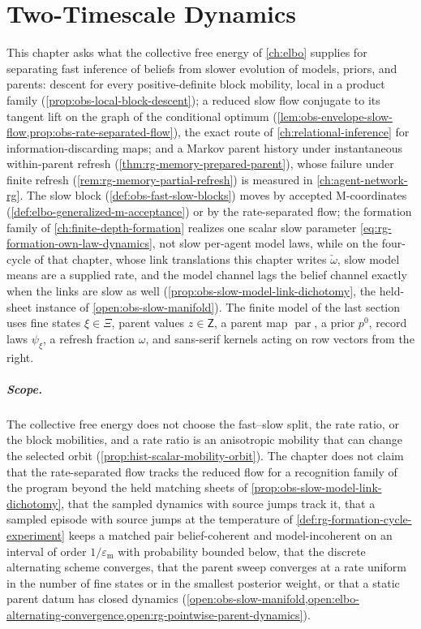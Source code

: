 \chapter{Two-Timescale Dynamics}
\label{ch:two-timescales}

This chapter asks what the collective free energy of \cref{ch:elbo} supplies for
separating fast inference of beliefs from slower evolution of models, priors, and
parents: descent for every positive-definite block mobility, local in a product family
(\cref{prop:obs-local-block-descent}); a reduced slow flow conjugate to its
tangent lift on the graph of the conditional optimum
(\cref{lem:obs-envelope-slow-flow,prop:obs-rate-separated-flow}), the exact route of
\cref{ch:relational-inference} for information-discarding maps; and a Markov parent
history under instantaneous within-parent refresh
(\cref{thm:rg-memory-prepared-parent}), whose failure under finite refresh
(\cref{rem:rg-memory-partial-refresh}) is measured in \cref{ch:agent-network-rg}. The
slow block (\cref{def:obs-fast-slow-blocks}) moves by accepted M-coordinates
(\cref{def:elbo-generalized-m-acceptance}) or by the rate-separated flow; the formation
family of \cref{ch:finite-depth-formation} realizes one scalar slow parameter
\eqref{eq:rg-formation-own-law-dynamics}, not slow per-agent model laws, while on
the four-cycle of that chapter, whose link translations this chapter writes
$\check\omega$, slow model means are a supplied rate, and the model
channel lags the belief channel exactly when the links are slow as well
(\cref{prop:obs-slow-model-link-dichotomy}, the held-sheet instance of
\cref{open:obs-slow-manifold}). The finite
model of the last section uses fine states $\xi\in\Xi$, parent values $z\in\mathsf Z$,
a parent map $\operatorname{par}$, a prior $p^0$, record laws $\psi_\xi$, a refresh
fraction $\omega$, and sans-serif kernels acting on row vectors from the right.

\paragraph{Scope.}
The collective free energy does not choose the fast--slow split, the rate ratio, or
the block mobilities, and a rate ratio is an anisotropic mobility that can change the
selected orbit (\cref{prop:hist-scalar-mobility-orbit}). The chapter does not claim
that the rate-separated flow tracks the reduced flow for a recognition family of the
program beyond the held matching sheets of
\cref{prop:obs-slow-model-link-dichotomy}, that the sampled dynamics with source
jumps track it, that a sampled episode with source jumps at the temperature of
\cref{def:rg-formation-cycle-experiment} keeps a matched pair belief-coherent and
model-incoherent on an interval of order $1/\varepsilon_{\mathrm m}$ with probability
bounded below, that the discrete alternating scheme converges, that the parent sweep
converges at a rate uniform in the number of fine states or in the smallest posterior
weight, or that a static parent datum has closed dynamics
(\cref{open:obs-slow-manifold,open:elbo-alternating-convergence,open:rg-pointwise-parent-dynamics}).

